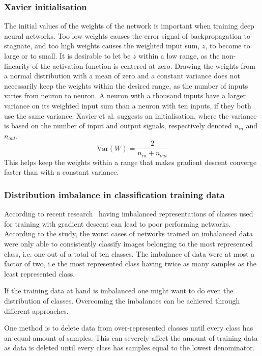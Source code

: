 \subsubsection{Xavier initialisation}
The initial values of the weights of the network is important when training deep neural networks. Too low weights causes the error signal of backpropagation to stagnate, and too high weights causes the weighted input sum, $z$, to become to large or to small. It is desirable to let be $z$ within a low range, as the non-linearity of the activation function is centered at zero.
Drawing the weights from a normal distribution with a mean of zero and a constant variance does not necessarily keep the weights within the desired range, as the number of inputs varies from neuron to neuron. A neuron with a thousand inputs have a larger variance on its weighted input sum than a neuron with ten inputs, if they both use the same variance.
Xavier et al. \cite{DBLP:journals/jmlr/GlorotB10} suggests an initialisation, where the variance is based on the number of input and output signals, respectively denoted $n_{in}$ and $n_{out}$.
$$ \text{Var}(W) = \frac{2}{n_{in} + n_{out}} $$
This helps keep the weights within a range that makes gradient descent converge faster than with a constant variance.

\subsubsection{Distribution imbalance in classification training data}
\label{sub:data-req}
According to recent research~\cite{balanced-classes} having imbalanced representations of classes used for training with gradient descent can lead to poor performing networks. According to the study, the worst cases of networks trained on imbalanced data were only able to consistently classify images belonging to the most represented class, i.e. one out of a total of ten classes. The imbalance of data were at most a factor of two, i.e the most represented class having twice as many samples as the least represented class.

If the training data at hand is imbalanced one might want to do even the distribution of classes. Overcoming the imbalances can be achieved through different approaches.

One method is to delete data from over-represented classes until every class has an equal amount of samples. This can severely affect the amount of training data as data is deleted until every class has samples equal to the lowest denominator.

